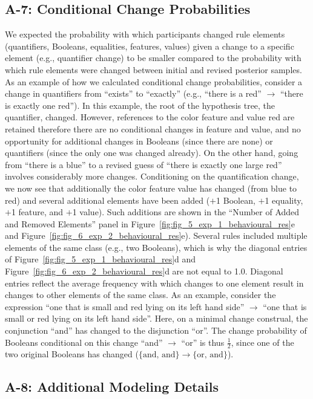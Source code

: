 \documentclass[doc,natbib,floatsintext]{apa7}
\begin{document}
\begin{appendices}
\subsection{A-7: Conditional Change Probabilities}\label{ap:a7_conditional_change_probabilities}
We expected the probability with which participants changed rule elements (quantifiers, Booleans, equalities, features, values) given a change to a specific element (e.g., quantifier change) to be smaller compared to the probability with which rule elements were changed between initial and revised posterior samples. As an example of how we calculated conditional change probabilities, consider a change in quantifiers from ``exists'' to ``exactly'' (e.g., ``there is a red'' $\rightarrow$ ``there is exactly one red''). In this example, the root of the hypothesis tree, the quantifier, changed. However, references to the color feature and value red are retained therefore there are no conditional changes in feature and value, and no opportunity for additional changes in Booleans (since there are none) or quantifiers (since the only one was changed already). On the other hand, going from ``there is a blue'' to a revised guess of ``there is exactly one large red'' involves considerably more changes. Conditioning on the quantification change, we now see that additionally the color feature value has changed (from blue to red) and several additional elements have been added ($+$1 Boolean, $+$1 equality, $+$1 feature, and $+$1 value). Such additions are shown in the ``Number of Added and Removed Elements'' panel in Figure~\ref{fig:fig_5_exp_1_behavioural_res}e and Figure~\ref{fig:fig_6_exp_2_behavioural_res}e). Several rules included multiple elements of the same class (e.g., two Booleans), which is why the diagonal entries of Figure~\ref{fig:fig_5_exp_1_behavioural_res}d and Figure~\ref{fig:fig_6_exp_2_behavioural_res}d are not equal to 1.0. Diagonal entries reflect the average frequency with which changes to one element result in changes to other elements of the same class. As an example, consider the expression ``one that is small and red lying on its left hand side'' $\rightarrow$ ``one that is small or red lying on its left hand side''. Here, on a minimal change construal, the conjunction ``and'' has changed to the disjunction ``or''. The change probability of Booleans conditional on this change ``and'' $\rightarrow$ ``or'' is thus $\frac{1}{2}$, since one of the two original Booleans has changed ($\{\text{and, and}\} \rightarrow \{\text{or, and}\}$).
 
\subsection{A-8: Additional Modeling Details}\label{ap:8_modeling_details}


\end{appendices}
\end{document}
